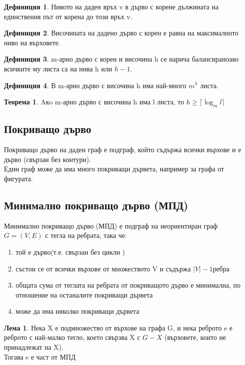 \documentclass[fleqn, 12pt]{article}
\theoremstyle{definition}
\newtheorem{definition}{Дефиниция}[subsection]
\newtheorem{theorem}{Теорема}[subsection]
\newtheorem{lemma}{Лема}[subsection]
\begin{document}
\begin{definition}
Нивото на даден връх v в дърво с корене дължината на единствения път от корена до този връх v.
\end{definition}

\begin{definition}
Височината на дадено дърво с корен е равна на максималното ниво на върховете.
\end{definition}

\begin{definition}
m-арно дърво с корен и височина h се нарича балансираноако всичките му листа са на нива h или $h - 1$.
\end{definition}

\begin{definition}
В m-арно дърво с височина h има най-много $m^h$ листа.
\end{definition}

\begin{theorem}
Aкo m-арно дърво с височина h има l листа, то $h \geq \lceil \log_{m}{l} \rceil$
\end{theorem}

\subsection{Покриващо дърво}
Покриващо дърво на даден граф е подграф, който съдържа всички върхове и е дърво (свързан без контури).\\
Един граф може да има много покриващи дървета, например за графа от фигурата.

\subsection{Минимално покриващо дърво (МПД)}
Минимално покриващо дърво (МПД) е подграф на неориентиран граф $G=(V,E)$ с тегла на ребрата, така че:
\begin{enumerate}
\item той е дърво(т.е. свързан без цикли )
\item състои се от всички върхове от множеството V и съдържа $|V| - 1$ребра
\item общата сума от теглата на ребрата от покриващото дърво е минимална, по отношение на останалите покриващи дървета
\item може да има няколко покриващи дървета
\end{enumerate}

\begin{lemma}
Нека X е подмножество от върхове на графа G, и нека реброто e е реброто с най-малко тегло, което свързва X с $G-X$ (върховете, които не принадлежат на X).\\
Тогава e е част от МПД
\end{lemma}
\end{document}

